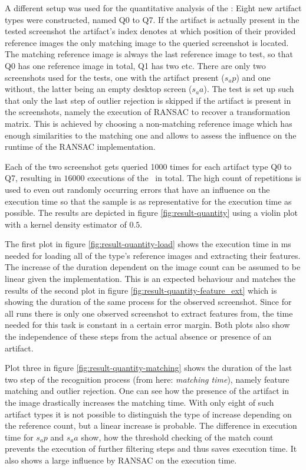 A different setup was used for the quantitative analysis of the \vd: Eight new artifact types were constructed, named Q0 to Q7. If the artifact is actually present in the tested screenshot the artifact's index denotes at which position of their provided reference images the only matching image to the queried screenshot is located. The matching reference image is always the last reference image to test, so that Q0 has one reference image in total, Q1 has two etc. There are only two screenshots used for the tests, one with the artifact present ($s_ap$) and one without, the latter being an empty desktop screen ($s_aa$). The test is set up such that only the last step of outlier rejection is skipped if the artifact is present in the screenshots, namely the execution of RANSAC to recover a transformation matrix. This is achieved by choosing a non-matching reference image which has enough similarities to the matching one and allows to assess the influence on the runtime of the RANSAC implementation.

Each of the two screenshot gets queried 1000 times for each artifact type Q0 to Q7, resulting in $16000$ executions of the \vd~in total. The high count of repetitions is used to even out randomly occurring errors that have an influence on the execution time so that the sample is as representative for the execution time as possible. The results are depicted in figure \ref{fig:result-quantity} using a violin plot with a kernel density estimator of $0.5$.

The first plot in figure \ref{fig:result-quantity-load} shows the execution time in ms needed for loading all of the type's reference images and extracting their features. The increase of the duration dependent on the image count can be assumed to be linear given the implementation. This is an expected behaviour and matches the results of the second plot in figure \ref{fig:result-quantity-feature_ext} which is showing the duration of the same process for the observed screenshot. Since for all runs there is only one observed screenshot to extract features from, the time needed for this task is constant in a certain error margin. Both plots also show the independence of these steps from the actual absence or presence of an artifact.

Plot three in figure \ref{fig:result-quantity-matching} shows the duration of the last two step of the recognition process (from here: \emph{matching time}), namely feature matching and outlier rejection. One can see how the presence of the artifact in the image drastically increases the matching time. With only eight of such artifact types it is not possible to distinguish the type of increase depending on the reference count, but a linear increase is probable. The difference in execution time for $s_ap$ and $s_aa$ show, how the threshold checking of the match count prevents the execution of further filtering steps and thus saves execution time. It also shows a large influence by RANSAC on the execution time.

